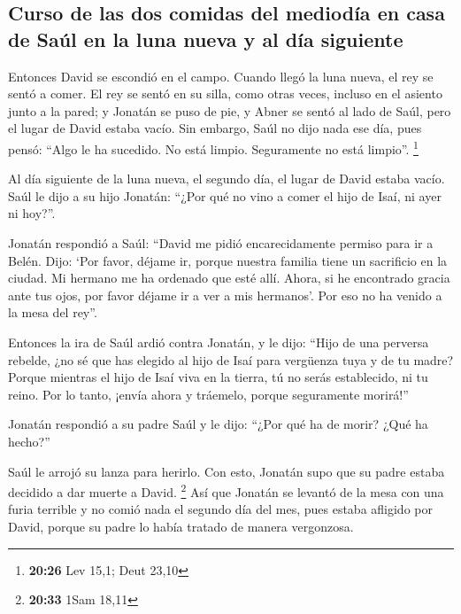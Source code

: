 \begin{paracol}{2}
\hypertarget{curso-de-las-dos-comidas-del-medioduxeda-en-casa-de-sauxfal-en-la-luna-nueva-y-al-duxeda-siguiente}{%
\subsection{Curso de las dos comidas del mediodía en casa de Saúl en la
luna nueva y al día
siguiente}\label{curso-de-las-dos-comidas-del-medioduxeda-en-casa-de-sauxfal-en-la-luna-nueva-y-al-duxeda-siguiente}}

 Entonces David se escondió en el campo. Cuando llegó la
luna nueva, el rey se sentó a comer.  El rey se sentó en
su silla, como otras veces, incluso en el asiento junto a la pared; y
Jonatán se puso de pie, y Abner se sentó al lado de Saúl, pero el lugar
de David estaba vacío.  Sin embargo, Saúl no dijo nada
ese día, pues pensó: ``Algo le ha sucedido. No está limpio. Seguramente
no está limpio''. \footnote{\textbf{20:26} Lev 15,1; Deut 23,10}

 Al día siguiente de la luna nueva, el segundo día, el
lugar de David estaba vacío. Saúl le dijo a su hijo Jonatán: ``¿Por qué
no vino a comer el hijo de Isaí, ni ayer ni hoy?''.

 Jonatán respondió a Saúl: ``David me pidió
encarecidamente permiso para ir a Belén.  Dijo: `Por
favor, déjame ir, porque nuestra familia tiene un sacrificio en la
ciudad. Mi hermano me ha ordenado que esté allí. Ahora, si he encontrado
gracia ante tus ojos, por favor déjame ir a ver a mis hermanos'. Por eso
no ha venido a la mesa del rey''.

 Entonces la ira de Saúl ardió contra Jonatán, y le dijo:
``Hijo de una perversa rebelde, ¿no sé que has elegido al hijo de Isaí
para vergüenza tuya y de tu madre?  Porque mientras el
hijo de Isaí viva en la tierra, tú no serás establecido, ni tu reino.
Por lo tanto, ¡envía ahora y tráemelo, porque seguramente morirá!''

 Jonatán respondió a su padre Saúl y le dijo: ``¿Por qué
ha de morir? ¿Qué ha hecho?''

 Saúl le arrojó su lanza para herirlo. Con esto, Jonatán
supo que su padre estaba decidido a dar muerte a David. \footnote{\textbf{20:33}
  1Sam 18,11}  Así que Jonatán se levantó de la mesa con
una furia terrible y no comió nada el segundo día del mes, pues estaba
afligido por David, porque su padre lo había tratado de manera
vergonzosa.


\end{paracol}
